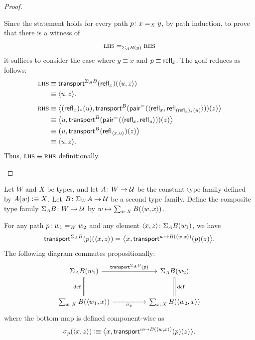 \begin{proof}
\begin{description}[font=\normalfont\scshape]
        \item[Inhabitation.] Since the statement holds for every path $p\colon x\eq Xy$, by path induction, to prove that there is a witness of
        \[
            \textsc{lhs}\mathrel{=_{\Sigma_AB(y)}}\textsc{rhs}
        \]
        it suffices to consider the case where $y \equiv x$ and $p \equiv \mathsf{refl}_x$. The goal reduces as follows:
        \begin{align*}
            \textsc{lhs}
                &\equiv\mathsf{transport}^{\Sigma_AB}(\mathsf{refl}_x)(\langle u,z\rangle)\\
                &\equiv\langle u,z\rangle.\\[1ex]
            \textsc{rhs}
                &\equiv\bigl\langle
                (\mathsf{refl}_x)_*(u),\mathsf{transport}^B
                (
                \mathsf{pair}^{\mathrel{=_{}}}
                (\langle
                \mathsf{refl}_x,\mathsf{refl}_{(\mathsf{refl}_x)_*(u)}
                \rangle)
                )
                (z)
                \bigr\rangle\\
            &\equiv\bigl\langle u,\mathsf{transport}^B
            (
                \mathsf{pair}^{\mathrel{=_{}}}(\langle\mathsf{refl}_x,\mathsf{refl}_u\rangle)
            )(z)\bigr\rangle\\
            &\equiv     
            \bigl(
                u,\mathsf{transport}^B(\mathsf{refl}_{\langle x,u\rangle})(z)
            \bigr)\\
            &\equiv\langle u,z\rangle.
        \end{align*}
        Thus, $\textsc{lhs}\equiv\textsc{rhs}$ definitionally.\qedhere
    \end{description}
\end{proof}

\begin{cor}\label{cor:transport-in-dependent-second-component}
    Let\/ $W$ and\/ $X$ be types, and let\/ $A\colon W\to\univ$ be the constant type family defined by\/ $A(w)\mathrel{\vcentcolon}\equiv X$. Let\/ $B\colon\Sigma_W A\to\univ$ be a second type family. Define the composite type family\/ $\Sigma_A B\colon W\to\univ$ by\/ $w\mapsto\sum_{x\colon X}B(\dep{w,x})$.
    
    For any path\/ $p\colon w_1\eq Ww_2$ and any element\/ $\dep{x,z}\colon\Sigma_AB(w_1)$, we have
    \[
        \mathsf{transport}^{\Sigma_A B}(p)(\langle x,z\rangle)
        \mathrel{=_{}}
        \bigl\langle x,\mathsf{transport}^{w\mapsto B(\langle w,x\rangle)}(p)(z)\bigr\rangle.
    \]
    The following diagram commutes propositionally:
    \[
        \begin{tikzcd}[column sep=huge, row sep=large]
            \Sigma_AB(w_1)
                    \arrow[r,"\fun{transport}^{\Sigma_A B}(p)"] 
                    \arrow[d,"\text{\upshape def }"',equal,no head]
                &\Sigma_AB(w_2)
                    \arrow[d,"\text{\,\upshape def}",equal,no head]\\
            \sum_{x\colon X}B(\dep{w_1,x})
                    \arrow[r,"\sigma_p"']
                &\sum_{x\colon X}B(\dep{w_2,x})
        \end{tikzcd}
    \]
    where the bottom map is defined component-wise as
    \[
        \sigma_p(\langle x,z\rangle)
            \mathrel{\vcentcolon}\equiv
            \bigl\langle
                x,
                \mathsf{transport}^{w\mapsto B(\langle w,x\rangle)}(p)(z)
            \bigr\rangle.
    \]
\end{cor}

